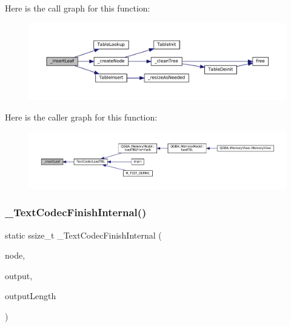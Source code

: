 Here is the call graph for this function\+:
\nopagebreak
\begin{figure}[H]
\begin{center}
\leavevmode
\includegraphics[width=350pt]{text-codec_8c_ad10dba7b4d43d411ba0c4edbfe5d203c_cgraph}
\end{center}
\end{figure}
Here is the caller graph for this function\+:
\nopagebreak
\begin{figure}[H]
\begin{center}
\leavevmode
\includegraphics[width=350pt]{text-codec_8c_ad10dba7b4d43d411ba0c4edbfe5d203c_icgraph}
\end{center}
\end{figure}
\mbox{\label{text-codec_8c_ac88972a459e050dd63076e077babffd0}} 
\subsubsection{\texorpdfstring{\+\_\+\+Text\+Codec\+Finish\+Internal()}{\_TextCodecFinishInternal()}}
{\footnotesize\ttfamily static ssize\+\_\+t \+\_\+\+Text\+Codec\+Finish\+Internal (\begin{DoxyParamCaption}\item[{struct Text\+Codec\+Node $\ast$}]{node,  }\item[{uint8\+\_\+t $\ast$}]{output,  }\item[{size\+\_\+t}]{output\+Length }\end{DoxyParamCaption})\hspace{0.3cm}{\ttfamily [static]}}

